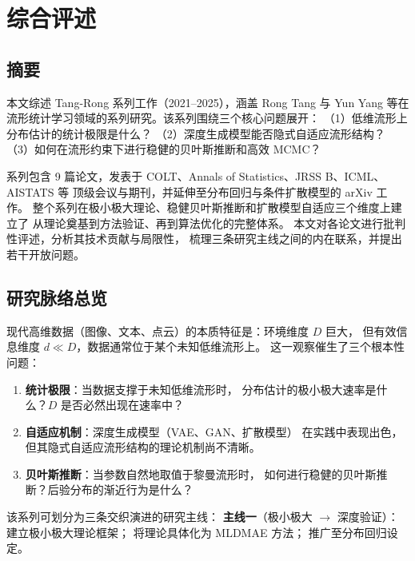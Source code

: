 \chapter{综合评述}\label{ch:chapter0}

\section{摘要}\label{sec:abstract}

本文综述 Tang-Rong 系列工作（2021--2025），涵盖 Rong Tang 与 Yun Yang
等在流形统计学习领域的系列研究。该系列围绕三个核心问题展开：
（1）低维流形上分布估计的统计极限是什么？
（2）深度生成模型能否隐式自适应流形结构？
（3）如何在流形约束下进行稳健的贝叶斯推断和高效 MCMC？

系列包含 9 篇论文，发表于 COLT、Annals of Statistics、JRSS B、ICML、AISTATS 等
顶级会议与期刊，并延伸至分布回归与条件扩散模型的 arXiv 工作。
整个系列在极小极大理论、稳健贝叶斯推断和扩散模型自适应三个维度上建立了
从理论奠基到方法验证、再到算法优化的完整体系。
本文对各论文进行批判性评述，分析其技术贡献与局限性，
梳理三条研究主线之间的内在联系，并提出若干开放问题。

\section{研究脉络总览}\label{sec:overview}

现代高维数据（图像、文本、点云）的本质特征是：环境维度 $D$ 巨大，
但有效信息维度 $d \ll D$，数据通常位于某个未知低维流形上。
这一观察催生了三个根本性问题：

\begin{enumerate}
    \item \textbf{统计极限}：当数据支撑于未知低维流形时，
          分布估计的极小极大速率是什么？$D$ 是否必然出现在速率中？
    \item \textbf{自适应机制}：深度生成模型（VAE、GAN、扩散模型）
          在实践中表现出色，但其隐式自适应流形结构的理论机制尚不清晰。
    \item \textbf{贝叶斯推断}：当参数自然地取值于黎曼流形时，
          如何进行稳健的贝叶斯推断？后验分布的渐近行为是什么？
\end{enumerate}

该系列可划分为三条交织演进的研究主线：
\textbf{主线一}（极小极大 $\to$ 深度验证）：
\citep{tang2022minimax} 建立极小极大理论框架；
\citep{tang2023lowdim} 将理论具体化为 MLDMAE 方法；
\citep{tang2025regression} 推广至分布回归设定。

